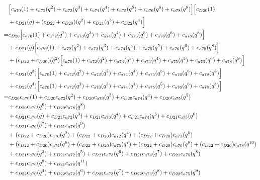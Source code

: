\documentclass[12pt]{article}
\begin{document}
\begin{align}
    &\Bigl[ c_{a70}(1) + c_{a72}(q^2) + c_{a73}(q^3) + c_{a74}(q^4) + c_{a75}(q^5) +  c_{a76}(q^6) + c_{a78}(q^8) \Bigr]\Bigl[ c_{D20}(1) \nonumber\\
    &+ c_{D21}(q) + (c_{D22} + c_{D20})(q^2) + c_{D21}(q^3) + c_{D22}(q^4) \Bigr]\\
    =& c_{D20}\Bigl[ c_{a70}(1) + c_{a72}(q^2) + c_{a73}(q^3) + c_{a74}(q^4) + c_{a75}(q^5) +  c_{a76}(q^6) + c_{a78}(q^8) \Bigr] \nonumber\\
    &+ c_{D21}(q)\Bigl[ c_{a70}(1) + c_{a72}(q^2) + c_{a73}(q^3) + c_{a74}(q^4) + c_{a75}(q^5) +  c_{a76}(q^6) + c_{a78}(q^8) \Bigr] \nonumber\\
    &+ (c_{D22} + c_{D20})(q^2)\Bigl[ c_{a70}(1) + c_{a72}(q^2) + c_{a73}(q^3) + c_{a74}(q^4) + c_{a75}(q^5) +  c_{a76}(q^6) + c_{a78}(q^8) \Bigr] \nonumber\\
    &+ c_{D21}(q^3)\Bigl[ c_{a70}(1) + c_{a72}(q^2) + c_{a73}(q^3) + c_{a74}(q^4) + c_{a75}(q^5) +  c_{a76}(q^6) + c_{a78}(q^8) \Bigr] \nonumber\\
    &+ c_{D22}(q^4)\Bigl[ c_{a70}(1) + c_{a72}(q^2) + c_{a73}(q^3) + c_{a74}(q^4) + c_{a75}(q^5) +  c_{a76}(q^6) + c_{a78}(q^8) \Bigr] \\
    =&  c_{D20}c_{a70}(1) + c_{D20}c_{a72}(q^2) + c_{D20}c_{a73}(q^3) + c_{D20}c_{a74}(q^4) + c_{D20}c_{a75}(q^5) \nonumber\\
    &+  c_{D20}c_{a76}(q^6) + c_{D20}c_{a78}(q^8)  \nonumber\\
    &+  c_{D21}c_{a70}(q) + c_{D21}c_{a72}(q^3) + c_{D21}c_{a73}(q^4) + c_{D21}c_{a74}(q^5) + c_{D21}c_{a75}(q^6) \nonumber\\
    &+  c_{D21}c_{a76}(q^7) + c_{D21}c_{a78}(q^9)  \nonumber\\
    &+  (c_{D22} + c_{D20})c_{a70}(q^2) + (c_{D22} + c_{D20})c_{a72}(q^4) + (c_{D22} + c_{D20})c_{a73}(q^5) \nonumber\\
    &+ (c_{D22} + c_{D20})c_{a74}(q^6) + (c_{D22} + c_{D20})c_{a75}(q^7) +  (c_{D22} + c_{D20})c_{a76}(q^8) + (c_{D22} + c_{D20})c_{a78}(q^{10})  \nonumber\\
    &+  c_{D21}c_{a70}(q^3) + c_{D21}c_{a72}(q^5) + c_{D21}c_{a73}(q^6) + c_{D21}c_{a74}(q^7) + c_{D21}c_{a75}(q^8) \nonumber\\
    &+  c_{D21}c_{a76}(q^9) + c_{D21}c_{a78}(q^{11}) \nonumber\\
    &+  c_{D22}c_{a70}(q^4) + c_{D22}c_{a72}(q^6) + c_{D22}c_{a73}(q^7) + c_{D22}c_{a74}(q^8) + c_{D22}c_{a75}(q^9) \nonumber\\

\end{align}
\end{document}
